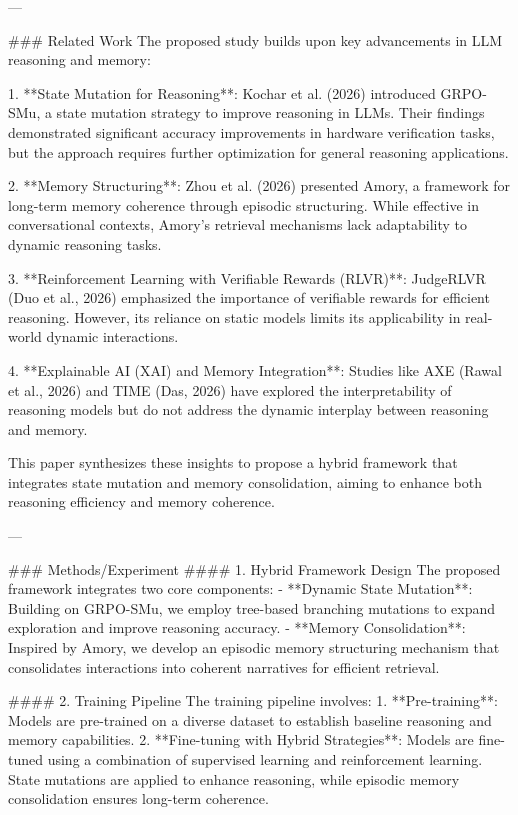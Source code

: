 ---

### Related Work  
The proposed study builds upon key advancements in LLM reasoning and memory:

1. **State Mutation for Reasoning**: Kochar et al. (2026) introduced GRPO-SMu, a state mutation strategy to improve reasoning in LLMs. Their findings demonstrated significant accuracy improvements in hardware verification tasks, but the approach requires further optimization for general reasoning applications.
   
2. **Memory Structuring**: Zhou et al. (2026) presented Amory, a framework for long-term memory coherence through episodic structuring. While effective in conversational contexts, Amory's retrieval mechanisms lack adaptability to dynamic reasoning tasks.

3. **Reinforcement Learning with Verifiable Rewards (RLVR)**: JudgeRLVR (Duo et al., 2026) emphasized the importance of verifiable rewards for efficient reasoning. However, its reliance on static models limits its applicability in real-world dynamic interactions.

4. **Explainable AI (XAI) and Memory Integration**: Studies like AXE (Rawal et al., 2026) and TIME (Das, 2026) have explored the interpretability of reasoning models but do not address the dynamic interplay between reasoning and memory.

This paper synthesizes these insights to propose a hybrid framework that integrates state mutation and memory consolidation, aiming to enhance both reasoning efficiency and memory coherence.

---

### Methods/Experiment  
#### 1. Hybrid Framework Design  
The proposed framework integrates two core components:
- **Dynamic State Mutation**: Building on GRPO-SMu, we employ tree-based branching mutations to expand exploration and improve reasoning accuracy.
- **Memory Consolidation**: Inspired by Amory, we develop an episodic memory structuring mechanism that consolidates interactions into coherent narratives for efficient retrieval.

#### 2. Training Pipeline  
The training pipeline involves:
1. **Pre-training**: Models are pre-trained on a diverse dataset to establish baseline reasoning and memory capabilities.
2. **Fine-tuning with Hybrid Strategies**: Models are fine-tuned using a combination of supervised learning and reinforcement learning. State mutations are applied to enhance reasoning, while episodic memory consolidation ensures long-term coherence.

